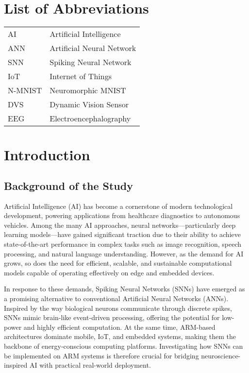 \documentclass[a4paper,12pt]{article}
\begin{document}
	\listoffigures
	\cleardoublepage
	
	\listoftables
	\cleardoublepage
	
	\section*{List of Abbreviations}
	\begin{tabular}{l l}
		AI & Artificial Intelligence \\
		ANN & Artificial Neural Network \\
		SNN & Spiking Neural Network \\
		IoT & Internet of Things \\
		N-MNIST & Neuromorphic MNIST \\
		DVS & Dynamic Vision Sensor \\
		EEG & Electroencephalography \\
	\end{tabular}
	\cleardoublepage
	
	
	\section{Introduction}
	
	\subsection{Background of the Study}
	Artificial Intelligence (AI) has become a cornerstone of modern technological development, powering applications from healthcare diagnostics to autonomous vehicles. Among the many AI approaches, neural networks—particularly deep learning models—have gained significant traction due to their ability to achieve state-of-the-art performance in complex tasks such as image recognition, speech processing, and natural language understanding. However, as the demand for AI grows, so does the need for efficient, scalable, and sustainable computational models capable of operating effectively on edge and embedded devices.
	
	In response to these demands, Spiking Neural Networks (SNNs) have emerged as a promising alternative to conventional Artificial Neural Networks (ANNs). Inspired by the way biological neurons communicate through discrete spikes, SNNs mimic brain-like event-driven processing, offering the potential for low-power and highly efficient computation. At the same time, ARM-based architectures dominate mobile, IoT, and embedded systems, making them the backbone of energy-conscious computing platforms. Investigating how SNNs can be implemented on ARM systems is therefore crucial for bridging neuroscience-inspired AI with practical real-world deployment.
	
\end{document}
